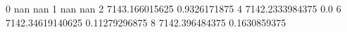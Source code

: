 0 nan nan
1 nan nan
2 7143.166015625 0.9326171875
4 7142.2333984375 0.0
6 7142.34619140625 0.11279296875
8 7142.396484375 0.1630859375
